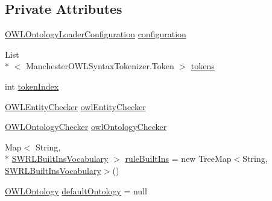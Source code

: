 \subsection*{Private Attributes}
\begin{DoxyCompactItemize}
\item 
\hyperlink{classorg_1_1semanticweb_1_1owlapi_1_1model_1_1_o_w_l_ontology_loader_configuration}{O\-W\-L\-Ontology\-Loader\-Configuration} \hyperlink{classorg_1_1coode_1_1owlapi_1_1manchesterowlsyntax_1_1_manchester_o_w_l_syntax_editor_parser_a58c064c2e717f78b0c145cb139087d3d}{configuration}
\item 
List\\*
$<$ Manchester\-O\-W\-L\-Syntax\-Tokenizer.\-Token $>$ \hyperlink{classorg_1_1coode_1_1owlapi_1_1manchesterowlsyntax_1_1_manchester_o_w_l_syntax_editor_parser_a50bb487054a703356de7e2199b174222}{tokens}
\item 
int \hyperlink{classorg_1_1coode_1_1owlapi_1_1manchesterowlsyntax_1_1_manchester_o_w_l_syntax_editor_parser_a47a4341beeddaf96c82a0a28daa634b2}{token\-Index}
\item 
\hyperlink{interfaceorg_1_1semanticweb_1_1owlapi_1_1expression_1_1_o_w_l_entity_checker}{O\-W\-L\-Entity\-Checker} \hyperlink{classorg_1_1coode_1_1owlapi_1_1manchesterowlsyntax_1_1_manchester_o_w_l_syntax_editor_parser_a526726a9ad5fc1f374d6f4457aea589f}{owl\-Entity\-Checker}
\item 
\hyperlink{interfaceorg_1_1semanticweb_1_1owlapi_1_1expression_1_1_o_w_l_ontology_checker}{O\-W\-L\-Ontology\-Checker} \hyperlink{classorg_1_1coode_1_1owlapi_1_1manchesterowlsyntax_1_1_manchester_o_w_l_syntax_editor_parser_ad22fc40c466f95658aca020769a339b9}{owl\-Ontology\-Checker}
\item 
Map$<$ String, \\*
\hyperlink{enumorg_1_1semanticweb_1_1owlapi_1_1vocab_1_1_s_w_r_l_built_ins_vocabulary}{S\-W\-R\-L\-Built\-Ins\-Vocabulary} $>$ \hyperlink{classorg_1_1coode_1_1owlapi_1_1manchesterowlsyntax_1_1_manchester_o_w_l_syntax_editor_parser_a15cc752bdf6e166e3e3268a37c765bd1}{rule\-Built\-Ins} = new Tree\-Map$<$String, \hyperlink{enumorg_1_1semanticweb_1_1owlapi_1_1vocab_1_1_s_w_r_l_built_ins_vocabulary}{S\-W\-R\-L\-Built\-Ins\-Vocabulary}$>$()
\item 
\hyperlink{interfaceorg_1_1semanticweb_1_1owlapi_1_1model_1_1_o_w_l_ontology}{O\-W\-L\-Ontology} \hyperlink{classorg_1_1coode_1_1owlapi_1_1manchesterowlsyntax_1_1_manchester_o_w_l_syntax_editor_parser_a00ac8f7972db38f67b1b5dea3a4bae4a}{default\-Ontology} = null

\end{DoxyCompactItemize}
